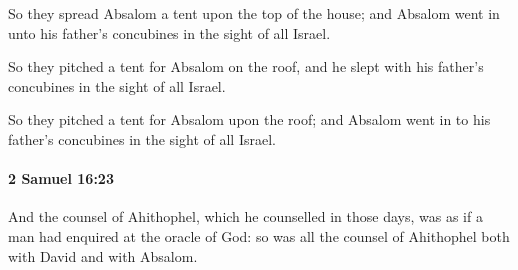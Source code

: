 			\begin{versebox}
					\item[BHS] 
					\item[ASV] So they spread Absalom a tent upon the top of the house; and Absalom went in unto his father's concubines in the sight of all Israel.
					\item[NIV] So they pitched a tent for Absalom on the roof, and he slept with his father’s concubines in the sight of all Israel.
					\item[NRSV] So they pitched a tent for Absalom upon the roof; and Absalom went in to his father’s concubines in the sight of all Israel.
			\end{versebox}

		\paragraph{2 Samuel 16:23} %
			\label{2SAMUEL-16-23}

			And the counsel of Ahithophel, which he counselled in those days, was as if a man had enquired at the oracle of God: so was all the counsel of Ahithophel both with David and with Absalom.


